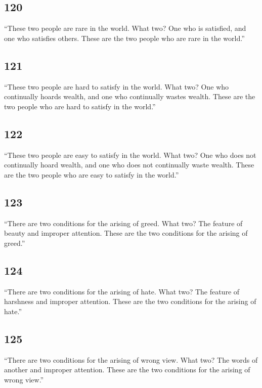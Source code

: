 \documentclass[12pt,openany]{book}%
\begin{document}
\subsection*{120 }

“These two people are rare in the world. What two? One who is satisfied, and one who satisfies others. These are the two people who are rare in the world.” 

\subsection*{121 }

“These two people are hard to satisfy in the world. What two? One who continually hoards wealth, and one who continually wastes wealth. These are the two people who are hard to satisfy in the world.” 

\subsection*{122 }

“These two people are easy to satisfy in the world. What two? One who does not continually hoard wealth, and one who does not continually waste wealth. These are the two people who are easy to satisfy in the world.” 

\subsection*{123 }

“There are two conditions for the arising of greed. What two? The feature of beauty and improper attention. These are the two conditions for the arising of greed.” 

\subsection*{124 }

“There are two conditions for the arising of hate. What two? The feature of harshness and improper attention. These are the two conditions for the arising of hate.” 

\subsection*{125 }

“There are two conditions for the arising of wrong view. What two? The words of another and improper attention. These are the two conditions for the arising of wrong view.” 
\end{document}

